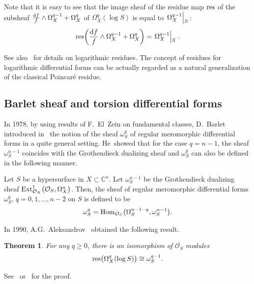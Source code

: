 \documentclass[10pt,a4paper]{amsart}
\numberwithin{equation}{section}
\newtheorem{Theorem}{Theorem}[section]
\begin{document}
Note that it is easy to see that the image sheaf of the residue map $ {\rm res} $ of the subsheaf ${\frac{{\rm d}f}{f}\wedge \Omega_X^{q-1} + \Omega_X^{q}} $ of $ \Omega_X^{q}(\log S)$ is equal to $\left. \Omega_X^{q-1}\middle|\raisebox{-0.7ex}[1ex][-2ex]{{\hspace{-1mm}\;$_S$}}\right.$:
\begin{gather*}
{\rm res}\bigg( \frac{{\rm d}f}{f}\wedge \Omega_X^{q-1} + \Omega_X^{q}\bigg) = \left.\Omega_X^{q-1}\middle|\raisebox{-0.7ex}[1ex][-2ex]{{\hspace{-1mm}\;$_S$}}\right..
\end{gather*}

See also~\cite{S} for details on logarithmic residues.
The concept of residues for logarithmic differential forms can be actually regarded as a natural generalization of the classical Poincar\'e residue.

\subsection{Barlet sheaf and torsion differential forms}

In 1978, by using results of F.~El~Zein on fundamental classes, D.~Barlet introduced in~\cite{B} the notion of the sheaf $\omega_S^{q}$ of regular meromorphic differential forms in a quite general setting. He~showed that for the case $q=n-1$, the sheaf $ \omega_S^{n-1}$ coincides with the
Grothendieck dualizing sheaf and $ \omega_S^{q} $ can also be defined in the following manner.

\begin{Definition}
 Let $S$ be a hypersurface in $X \subset {\mathbb C}^n$. Let $ \omega_S^{n-1} $ be the Grothendieck dua\-li\-zing sheaf $ {\rm Ext}_{{\mathcal O}_X}^{1}\big({\mathcal O}_S, \Omega_X^{n}\big)$. Then, the sheaf of regular meromorphic differential forms $ \omega_S^{q}$, $q=0,1,\dots, n-2$ on $S$ is defined to be
\begin{gather*}
 \omega_S^{q} = {\rm Hom}_{{\mathcal O}_S}\big(\Omega_S^{n-1-q}, \omega_S^{n-1}\big).
\end{gather*}

\end{Definition}



In 1990, A.G.~Aleksandrov~\cite{A} obtained the following result.

{\samepage\begin{Theorem}
 For any $ q \geq 0$, there is an isomorphism of $ {\mathcal O}_S $ modules
\begin{gather*}
{\rm res}\big(\Omega_X^{q}(\log S)\big) \cong \omega_S^{q-1}.
\end{gather*}

\end{Theorem}

See~\cite{A} or~\cite{A05} for the proof.

}
\end{document}
